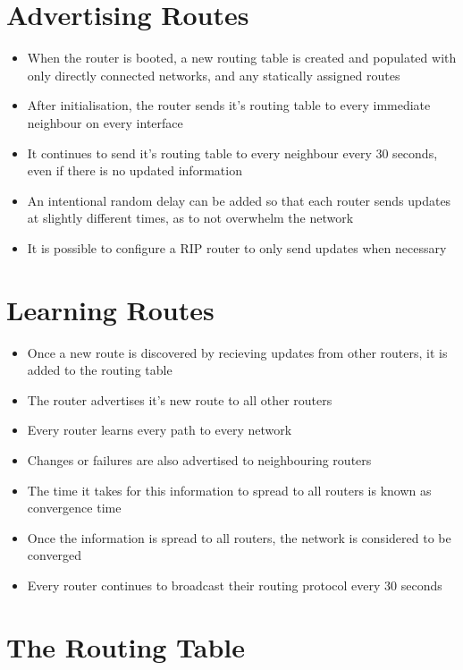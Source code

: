 \section*{Advertising Routes}

\begin{itemize}
  \item When the router is booted, a new routing table is created and populated with only directly connected networks, and any statically assigned routes
  \item After initialisation, the router sends it's routing table to every immediate neighbour on every interface
  \item It continues to send it's routing table to every neighbour every 30 seconds, even if there is no updated information
  \item An intentional random delay can be added so that each router sends updates at slightly different times, as to not overwhelm the network
  \item It is possible to configure a RIP router to only send updates when necessary
\end{itemize}

\section*{Learning Routes}

\begin{itemize}
  \item Once a new route is discovered by recieving updates from other routers, it is added to the routing table
  \item The router advertises it's new route to all other routers
  \item Every router learns every path to every network
  \item Changes or failures are also advertised to neighbouring routers
  \item The time it takes for this information to spread to all routers is known as convergence time
  \item Once the information is spread to all routers, the network is considered to be converged
  \item Every router continues to broadcast their routing protocol every 30 seconds
\end{itemize}

\section*{The Routing Table}

